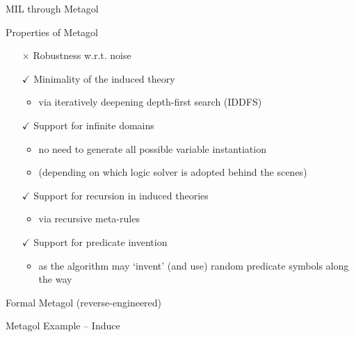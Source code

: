 \documentclass[presentation]{beamer}\mode<presentation>{\usetheme{AMSBolognaFC}}
\begin{document}
\begin{frame}[allowframebreaks]{MIL through Metagol}
    \begin{block}{Properties of Metagol}
        \begin{itemize}
            \item[$\times$] \alert{Robustness} w.r.t. noise
            \item[$\checkmark$] \alert{Minimality} of the induced theory
            \begin{itemize}
                \item via iteratively deepening depth-first search (IDDFS)
            \end{itemize}
            \item[$\checkmark$] Support for \alert{infinite domains}
            \begin{itemize}
                \item no need to generate all possible variable instantiation
                \item (depending on which logic solver is adopted behind the scenes)
            \end{itemize}
            \item[$\checkmark$] Support for \alert{recursion} in induced theories
            \begin{itemize}
                \item via recursive meta-rules
            \end{itemize}
            \item[$\checkmark$] Support for \alert{predicate invention}
            \begin{itemize}
                \item as the algorithm may `invent' (and use) random predicate symbols along the way
            \end{itemize}
        \end{itemize}
    \end{block}
\end{frame}

\begin{frame}{Formal Metagol (reverse-engineered)}
    
\end{frame}

\begin{frame}[allowframebreaks]{Metagol Example -- Induce }
    \framebreak
\end{frame}
\end{document}
